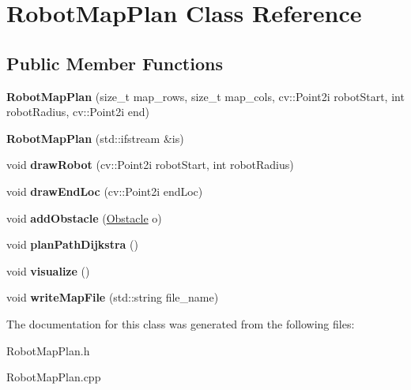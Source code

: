 \hypertarget{class_robot_map_plan}{}\section{Robot\+Map\+Plan Class Reference}
\label{class_robot_map_plan}
\subsection*{Public Member Functions}
\begin{DoxyCompactItemize}
\item 
\mbox{\label{class_robot_map_plan_a82a42ffc14f61c17da58a710f3559e36}} 
{\bfseries Robot\+Map\+Plan} (size\+\_\+t map\+\_\+rows, size\+\_\+t map\+\_\+cols, cv\+::\+Point2i robot\+Start, int robot\+Radius, cv\+::\+Point2i end)
\item 
\mbox{\label{class_robot_map_plan_a765512f6206fec3ddcb1e3c9f0102b45}} 
{\bfseries Robot\+Map\+Plan} (std\+::ifstream \&is)
\item 
\mbox{\label{class_robot_map_plan_af149ec547ca20fd922a4a6b3a47b2434}} 
void {\bfseries draw\+Robot} (cv\+::\+Point2i robot\+Start, int robot\+Radius)
\item 
\mbox{\label{class_robot_map_plan_a5efe57134c39622d1d9afcde6b4fe012}} 
void {\bfseries draw\+End\+Loc} (cv\+::\+Point2i end\+Loc)
\item 
\mbox{\label{class_robot_map_plan_ace50ea778fd1c72585aa00971b5e917a}} 
void {\bfseries add\+Obstacle} (\mbox{\hyperlink{struct_obstacle}{Obstacle}} o)
\item 
\mbox{\label{class_robot_map_plan_a0c033b55ffd0632805ed0ff40863538b}} 
void {\bfseries plan\+Path\+Dijkstra} ()
\item 
\mbox{\label{class_robot_map_plan_a21bcb74dd6576f08068b6f218edae70f}} 
void {\bfseries visualize} ()
\item 
\mbox{\label{class_robot_map_plan_a8d239d20312ed84e602ff2e2ca58f386}} 
void {\bfseries write\+Map\+File} (std\+::string file\+\_\+name)
\end{DoxyCompactItemize}


The documentation for this class was generated from the following files\+:\begin{DoxyCompactItemize}
\item 
Robot\+Map\+Plan.\+h\item 
Robot\+Map\+Plan.\+cpp\end{DoxyCompactItemize}
